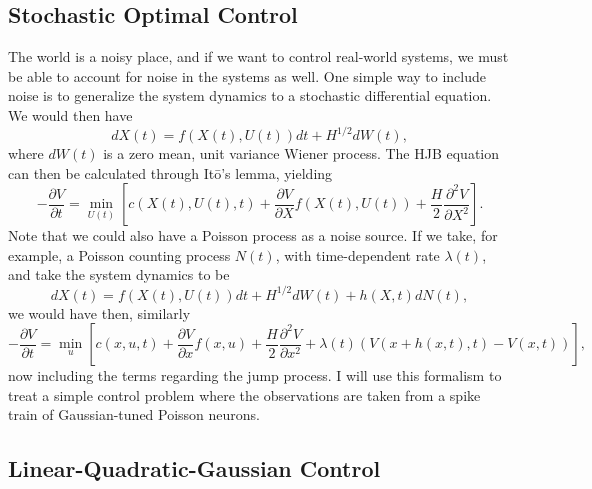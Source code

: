 \subsection{Stochastic Optimal Control}

The world is a noisy place, and if we want to control real-world systems, we must be able to account for noise in the systems as well. One simple way to include noise is to generalize the system dynamics to a stochastic differential equation. We would then have
$$
dX(t) = f(X(t),U(t)) dt + H^{1/2} dW(t),
$$
where $dW(t)$ is a zero mean, unit variance Wiener process.
The HJB equation can then be calculated through It\=o's lemma, yielding
$$
-\frac{\partial V}{\partial t} = \min_{U(t)} \left[c(X(t),U(t),t) + \frac{\partial V}{\partial X} f(X(t),U(t)) + \frac{H}{2} \frac{\partial^2 V}{\partial X^2} \right].
$$
Note that we could also have a Poisson process as a noise source. If we take, for example, a Poisson counting process $N(t)$, with time-dependent rate $\lambda(t)$, and take the system dynamics to be
$$
dX(t) = f(X(t),U(t)) dt + H^{1/2} dW(t) + h(X,t) dN(t),
$$
we would have then, similarly
$$
-\frac{\partial V}{\partial t} = \min_{u} \left[c(x,u,t) + \frac{\partial V}{\partial x} f(x,u) + \frac{H}{2} \frac{\partial^2 V}{\partial x^2} + \lambda(t) \left(V(x+h(x,t),t)-V(x,t)\right)\right],
$$
now including the terms regarding the jump process.\cite{Theodorou2012,Sennewald2006} I will use this formalism to treat a simple control problem where the observations are taken from a spike train of Gaussian-tuned Poisson neurons.

\subsection{Linear-Quadratic-Gaussian Control}

